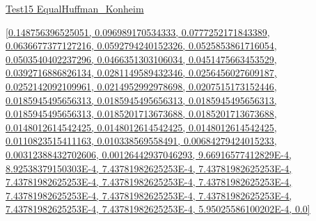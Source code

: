 \documentclass[12pt]{article}
\begin{document}
\noindent \url{Test15 EqualHuffman_Konheim}

\noindent \url{[0.148756396525051, 0.096989170534333, 0.0777252171843389, 0.0636677377127216, 0.0592794240152326, 0.0525853861716054, 0.0503540402237296, 0.0466351303106034, 0.0451475663453529, 0.0392716886826134, 0.0281149589432346, 0.0256456027609187, 0.0252142092109961, 0.0214952992978698, 0.0207515173152446, 0.0185945495656313, 0.0185945495656313, 0.0185945495656313, 0.0185945495656313, 0.0185201713673688, 0.0185201713673688, 0.0148012614542425, 0.0148012614542425, 0.0148012614542425, 0.0110823515411163, 0.010338569558491, 0.00684279424015233, 0.00312388432702606, 0.00126442937046293, 9.66916577412829E-4, 8.92538379150303E-4, 7.43781982625253E-4, 7.43781982625253E-4, 7.43781982625253E-4, 7.43781982625253E-4, 7.43781982625253E-4, 7.43781982625253E-4, 7.43781982625253E-4, 7.43781982625253E-4, 7.43781982625253E-4, 7.43781982625253E-4, 5.95025586100202E-4, 0.0]}
\end{document}
